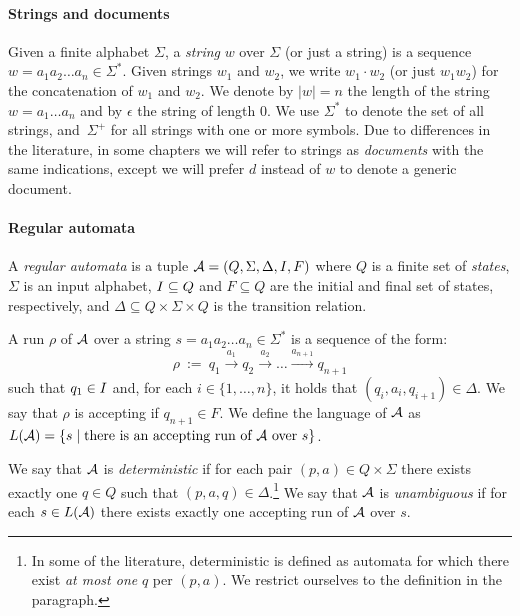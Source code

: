 \paragraph{Strings and documents} 
Given a finite alphabet $\Sigma$, a \emph{string} $w$ over $\Sigma$ (or just a string) is a sequence $w = a_1 a_2 \ldots a_n\in\Sigma^*$. Given strings $w_1$ and $w_2$, we write $w_1 \cdot w_2$ (or just $w_1w_2$) for the concatenation of $w_1$ and $w_2$. We denote by $|w| = n$ the length of the string $w = a_1 \ldots a_n$ and by $\epsilon$ the string of length $0$. 
We use $\Sigma^*$ to denote the set of all strings, and~$\Sigma^+$ for all strings with one or more symbols.
Due to differences in the literature, in some chapters we will refer to strings as \emph{documents} with the same indications, except we will prefer $d$ instead of $w$ to denote a generic document.

\paragraph{Regular automata} 
A \emph{regular automata} is a tuple $\mathcal{A} = (Q, \Sigma, \Delta, I, F)$ where $Q$ is a finite set of \emph{states}, $\Sigma$ is an input alphabet, $I \subseteq Q$ and $F \subseteq Q$ are the initial and final set of states, respectively, and $\Delta \subseteq Q\times \Sigma \times Q$ is the transition relation.

A run $\rho$ of $\mathcal{A}$ over a string $s = a_1a_2\ldots a_n \in\Sigma^*$ is a sequence of the form:
$$
\rho \ := \ q_1 \xrightarrow{a_1} q_2 \xrightarrow{a_2} \ldots \xrightarrow{a_{n+1}} q_{n+1}
$$
such that $q_1\in I$ and, for each $i\in \{1,\ldots, n\}$, it holds that $(q_i,a_i,q_{i+1})\in\Delta$.
We say that $\rho$ is accepting if $q_{n+1}\in F$.
We define the language of $\mathcal{A}$ as $L(\mathcal{A}) = \{s\mid \text{there is an accepting run of $\mathcal{A}$ over $s$}\}$.

We say that $\mathcal{A}$ is \emph{deterministic} if for each pair $(p,a)\in Q\times\Sigma$ there exists exactly one $q\in Q$ such that $(p,a,q)\in\Delta$.\footnote{In some of the literature, deterministic is defined as automata for which there exist \emph{at most one} $q$ per $(p,a)$. We restrict ourselves to the definition in the paragraph.}
We say that $\mathcal{A}$ is \emph{unambiguous} if for each $s\in L(\mathcal{A})$ there exists exactly one accepting run of $\mathcal{A}$ over $s$.